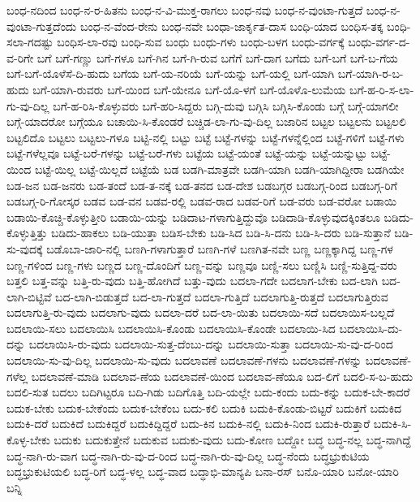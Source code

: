 {ಬಂಧ-ನದಿಂದ
ಬಂಧ-ನ-ರ-ಹಿತನು
ಬಂಧ-ನ-ವಿ-ಮುಕ್ತ-ರಾಗಲು
ಬಂಧ-ನವು
ಬಂಧ-ನ-ವುಂಟಾ-ಗುತ್ತದೆ
ಬಂಧ-ನ-ವುಂಟಾ-ಗುತ್ತದೆಂದು
ಬಂಧ-ನ-ವೆಂದ-ರೇನು
ಬಂಧ-ನವೇ
ಬಂಧಾ-ಜಾರ್ಕೃತ-ದಾಸ
ಬಂಧಿ-ಯಾದ
ಬಂಧಿಸ-ತಕ್ಕ
ಬಂಧಿ-ಸಲಾ-ಗದಷ್ಟು
ಬಂಧಿಸ-ಲಾ-ರವು
ಬಂಧಿ-ಸುವ
ಬಂಧು
ಬಂಧು-ಗಳು
ಬಂಧು-ಬಳಗ
ಬಂಧು-ವರ್ಗಕ್ಕೆ
ಬಂಧು-ವರ್ಗ-ದ-ವ-ರಿಗೇ
ಬಗೆ
ಬಗೆ-ಗಣ್ಣು
ಬಗೆ-ಗಳೂ
ಬಗೆ-ಗಿನ
ಬಗೆ-ಗಿ-ರುವ
ಬಗೆಗೆ
ಬಗೆ-ದಾಗ
ಬಗೆದು
ಬಗೆ-ಬಗೆ
ಬಗೆ-ಬ-ಗೆಯ
ಬಗೆ-ಬಗೆ-ಯೊಳೆಸೆ-ದಿ-ಹುದು
ಬಗೆಯ
ಬಗೆ-ಯ-ನರಿಯೆ
ಬಗೆ-ಯನ್ನು
ಬಗೆ-ಯಲ್ಲಿ
ಬಗೆ-ಯಾಗಿ
ಬಗೆ-ಯಾಗಿ-ರ-ಬ-ಹುದು
ಬಗೆ-ಯಾಗಿ-ರುವರು
ಬಗೆ-ಯಿಂದ
ಬಗೆ-ಯೇನೂ
ಬಗೆ-ಯೊ-ಳಗೆ
ಬಗೆ-ಯೊಳೊ-ಲುಮೆಯ
ಬಗೆ-ಹ-ರಿ-ಸ-ಲಾ-ಗು-ವು-ದಿಲ್ಲ
ಬಗೆ-ಹ-ರಿಸಿ-ಕೊಳ್ಳುವರು
ಬಗೆ-ಹರಿ-ಸಿದ್ದರು
ಬಗ್ಗಿ-ದುವು
ಬಗ್ಗಿಸಿ
ಬಗ್ಗಿಸಿ-ಕೊಂಡು
ಬಗ್ಗೆ
ಬಗ್ಗೆ-ಯಾಗಲೀ
ಬಗ್ಗೆ-ಯಾದರೋ
ಬಗ್ಗೆಯೂ
ಬಚಾಯಿ-ಸಿ-ಕೊಂಡರೆ
ಬಚ್ಚಿಡ-ಲಾ-ಗು-ವು-ದಿಲ್ಲ
ಬಜಾರಿನ
ಬಟ್ಟಲ
ಬಟ್ಟಲನು
ಬಟ್ಟಲಲಿ
ಬಟ್ಟಲಿದೊ
ಬಟ್ಟಲು
ಬಟ್ಟಲು-ಗಳೂ
ಬಟ್ಟಿ-ನಲ್ಲಿ
ಬಟ್ಟು
ಬಟ್ಟೆ
ಬಟ್ಟೆ-ಗಳನ್ನು
ಬಟ್ಟೆ-ಗಳನ್ನೆಲ್ಲಿಂದ
ಬಟ್ಟೆ-ಗಳಿಗೆ
ಬಟ್ಟೆ-ಗಳು
ಬಟ್ಟೆ-ಗಳೆಲ್ಲವೂ
ಬಟ್ಟೆ-ಬರೆ-ಗಳನ್ನು
ಬಟ್ಟೆ-ಬರೆ-ಗಳು
ಬಟ್ಟೆಯ
ಬಟ್ಟೆ-ಯಂತೆ
ಬಟ್ಟೆ-ಯನ್ನು
ಬಟ್ಟೆ-ಯನ್ನುಟ್ಟು
ಬಟ್ಟೆ-ಯಿಂದ
ಬಟ್ಟೆ-ಯಿಲ್ಲ
ಬಟ್ಟೆ-ಯಿಲ್ಲದೆ
ಬಟ್ಟೆಯೆ
ಬಡ
ಬಡಗಿ-ಮಾತ್ರವೇ
ಬಡಗಿ-ಯಾಗಿ
ಬಡಗಿ-ಯಾಗಿದ್ದೀರಾ
ಬಡಗಿಯೇ
ಬಡ-ಜನ
ಬಡ-ಜನರು
ಬಡ-ತಂದೆ
ಬಡ-ತ-ನಕ್ಕೆ
ಬಡ-ತನದ
ಬಡ-ದೇಶ
ಬಡಬಗ್ಗರ
ಬಡಬಗ್ಗ-ರಿಂದ
ಬಡಬಗ್ಗ-ರಿಗೆ
ಬಡಬಗ್ಗ-ರಿ-ಗೋಸ್ಕರ
ಬಡವ
ಬಡ-ವನ
ಬಡವ-ರಲ್ಲಿ
ಬಡವ-ರಾದ
ಬಡವ-ರಿಗೆ
ಬಡ-ವರು
ಬಡ-ವರೋ
ಬಡಾಯಿ
ಬಡಾಯಿ-ಕೊಚ್ಚಿ-ಕೊಳ್ಳುತ್ತೀರಿ
ಬಡಾಯಿ-ಯನ್ನು
ಬಡಿದಾಟ-ಗಳಾಗುತ್ತಿದ್ದುವೊ
ಬಡಿದಾಡಿ-ಕೊಳ್ಳುವುದಕ್ಕಿಂತಲೂ
ಬಡಿದು-ಕೊಳ್ಳುತ್ತಿತ್ತು
ಬಡಿದು-ಹಾಕಲು
ಬಡಿ-ಯುತ್ತಾ
ಬಡಿಸ-ಬೇಕು
ಬಡಿ-ಸಿದ
ಬಡಿ-ಸಿ-ದನು
ಬಡಿ-ಸಿ-ದರು
ಬಡಿ-ಸುತ್ತಾನೆ
ಬಡಿ-ಸು-ವುದಕ್ಕೆ
ಬಡೊಬಾ-ಜಾರಿ-ನಲ್ಲಿ
ಬಣಗಿ-ಗಳಾಗುತ್ತಾರೆ
ಬಣಗಿ-ಗಳೆ
ಬಣಗಿತ-ನವೇ
ಬಣ್ಣ
ಬಣ್ಣಕ್ಕಾಗಿದ್ದ
ಬಣ್ಣ-ಗಳ
ಬಣ್ಣ-ಗಳಿಂದ
ಬಣ್ಣ-ಗಳು
ಬಣ್ಣದ
ಬಣ್ಣ-ದೊಂದಿಗೆ
ಬಣ್ಣ-ವನ್ನು
ಬಣ್ಣವೂ
ಬಣ್ಣಿ-ಸಲು
ಬಣ್ಣಿಸಿ
ಬಣ್ಣಿ-ಸುತ್ತಿದ್ದ-ವರು
ಬತ್ತಲಿ
ಬತ್ತ-ವನ್ನು
ಬತ್ತಿ-ರು-ವುದು
ಬತ್ತಿ-ಹೋಗಿದೆ
ಬತ್ತು-ವುದು
ಬದಲಾ-ಗದೇ
ಬದಲಾಗ-ಬೇಕು
ಬದ-ಲಾಗಿ
ಬದ-ಲಾಗಿ-ಬಿಟ್ಟಿವೆ
ಬದ-ಲಾಗಿ-ಬಿಡುತ್ತದೆ
ಬದ-ಲಾ-ಗುತ್ತದೆ
ಬದಲಾ-ಗುತ್ತಿದೆ
ಬದಲಾಗುತ್ತಿ-ರುತ್ತದೆ
ಬದಲಾಗುತ್ತಿರುವ
ಬದಲಾಗುತ್ತಿ-ರು-ವುದು
ಬದಲಾಗು-ವುದು
ಬದಲಾ-ದರೆ
ಬದ-ಲಾ-ಯಿತು
ಬದಲಾಯಿ-ಸದೆ
ಬದಲಾಯಿಸ-ಬಲ್ಲದೆ
ಬದಲಾಯಿ-ಸಲು
ಬದಲಾಯಿಸಿ
ಬದಲಾಯಿಸಿ-ಕೊಂಡು
ಬದಲಾಯಿಸಿ-ಕೊಂಡೇ
ಬದಲಾಯಿ-ಸಿದ
ಬದಲಾಯಿಸಿ-ದು-ದನ್ನು
ಬದಲಾಯಿಸಿ-ರು-ವುದು
ಬದಲಾಯಿ-ಸುತ್ತ-ದೆಂಬು-ದನ್ನು
ಬದಲಾಯಿ-ಸುತ್ತಾ
ಬದಲಾಯಿ-ಸು-ವು-ದ-ರಿಂದ
ಬದಲಾಯಿ-ಸು-ವು-ದಿಲ್ಲ
ಬದಲಾಯಿ-ಸು-ವುದು
ಬದಲಾವಣೆ
ಬದಲಾವಣೆ-ಗಳನು
ಬದಲಾವಣೆ-ಗಳನ್ನು
ಬದಲಾವಣೆ-ಗಳೆಲ್ಲ
ಬದಲಾವಣೆ-ಮಾಡಿ
ಬದಲಾವ-ಣೆಯ
ಬದಲಾವಣೆ-ಯಿಂದ
ಬದಲಾವ-ಣೆಯೂ
ಬದ-ಲಿಗೆ
ಬದಲಿ-ಸ-ಬ-ಹುದು
ಬದಲಿ-ಸುತ
ಬದಲು
ಬದಿಗಿಟ್ಟರೂ
ಬದಿ-ಗಿಡು
ಬದಿಗೊತ್ತಿ
ಬದಿ-ಯಲ್ಲೇ
ಬದು-ಕಂದು
ಬದು-ಕನ್ನು
ಬದುಕ-ಬೇ-ಕಾದರೆ
ಬದುಕ-ಬೇಕು
ಬದುಕ-ಬೇಕೆಂದು
ಬದುಕ-ಬೇಕೆಂಬ
ಬದು-ಕಲಿ
ಬದುಕಿ
ಬದುಕಿ-ಕೊಂಡು-ಬಿಟ್ಟರೆ
ಬದುಕಿಗೆ
ಬದುಕಿದ
ಬದುಕಿ-ದರೆ
ಬದುಕಿದೆ
ಬದುಕಿದ್ದರೆ
ಬದುಕಿದ್ದಿದ್ದರೆ
ಬದು-ಕಿನ
ಬದುಕಿ-ನಲ್ಲಿ
ಬದುಕಿ-ನಿಂದ
ಬದುಕಿ-ರುತ್ತಾರೆ
ಬದುಕಿ-ಸಿ-ಕೊಳ್ಳ-ಬೇಕು
ಬದುಕು
ಬದುಕುತ್ತೇನೆ
ಬದುಕುವ
ಬದುಕು-ವುದು
ಬದು-ಕೋಣ
ಬದ್ದೋ
ಬದ್ಧ
ಬದ್ಧ-ನಲ್ಲ
ಬದ್ಧ-ನಾಗಿದ್ದೆ
ಬದ್ಧ-ನಾಗಿ-ರು-ವಾಗ
ಬದ್ಧ-ನಾಗಿ-ರು-ವು-ದ-ರಿಂದ
ಬದ್ಧ-ನಾಗಿ-ರು-ವು-ದಿಲ್ಲ
ಬದ್ಧ-ನೆಂದು
ಬದ್ಧಭ್ರುಕುಟಿಯ
ಬದ್ಧಭ್ರುಕುಟಿಯಲಿ
ಬದ್ಧ-ರಿಗೆ
ಬದ್ಧ-ಳಲ್ಲ
ಬದ್ಧ-ವಾದ
ಬದ್ಧಾಭಿ-ಮಾನ್ಯಪಿ
ಬನಾ-ರಸ್
ಬನೊ-ಯಾರಿ
ಬನೋ-ಯಾರಿ
ಬನ್ನಿ
}
